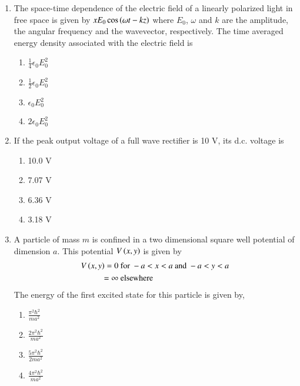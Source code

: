 \documentclass[journal]{IEEEtran}
\begin{document}
\begin{enumerate}
\item The space-time dependence of the electric field of a linearly polarized light in free space is given by $xE_0 \cos{\ensuremath{\left(\omega t - kz\right)}}$ where $E_0$, $\omega$ and $k$ are the amplitude, the angular frequency and the wavevector, respectively. The time averaged energy density associated with the electric field is
\begin{multicols}{2}
    \begin{enumerate}
        \item $\frac{1}{4} \epsilon_0 E_0^2$
        \item $\frac{1}{2} \epsilon_0 E_0^2$
        \item $\epsilon_0 E_0^2$
        \item $2 \epsilon_0 E_0^2$
    \end{enumerate}
\end{multicols}

\item If the peak output voltage of a full wave rectifier is 10 V, its d.c. voltage is
\begin{multicols}{2}
    \begin{enumerate}
        \item 10.0 V
        \item 7.07 V
        \item 6.36 V
        \item 3.18 V
    \end{enumerate}
\end{multicols}

\item A particle of mass $m$ is confined in a two dimensional square well potential of dimension $a$. This
potential $V\left(x,y\right)$ is given by
\begin{align*}
    V\left(x,y\right) = 0 & \text{ for } -a < x < a \text{ and } -a < y < a\\
    = \infty &  \text{ elsewhere}
\end{align*}
The energy of the first excited state for this particle is given by,
\begin{multicols}{2}
    \begin{enumerate}
        \item $\frac{\pi^2 \hbar^2}{m a^2}$
        \item $\frac{2 \pi^2 \hbar^2}{m a^2}$
        \item $\frac{5 \pi^2 \hbar^2}{2 m a^2}$
        \item $\frac{4 \pi^2 \hbar^2}{m a^2}$
    \end{enumerate}
\end{multicols}


\end{enumerate}
\end{document}
